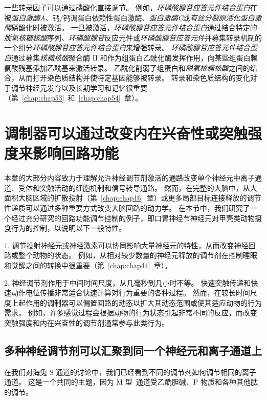 一些转录因子可以通过磷酸化直接调节。
例如，\textit{环磷酸腺苷应答元件结合蛋白}在被\textit{蛋白激酶A}、钙/钙调蛋白依赖性蛋白激酶、\textit{蛋白激酶C}或\textit{有丝分裂原活化蛋白激酶}磷酸化时被激活。
一旦被激活，\textit{环磷酸腺苷应答元件结合蛋白}通过结合特定的\textit{脱氧核糖核酸}序列、\textit{环磷酸腺苷}反应元件或\textit{环磷酸腺苷应答元件}并募集转录机制的一个组分\textit{环磷酸腺苷应答元件结合蛋白}来增强转录。
\textit{环磷酸腺苷应答元件结合蛋白}通过募集\textit{核糖核酸}聚合酶 II 和作为组蛋白乙酰化酶发挥作用，向某些组蛋白赖氨酸残基添加乙酰基来激活转录。
乙酰化削弱了组蛋白和\textit{脱氧核糖核酸}之间的结合，从而打开染色质结构并使特定基因能够被转录。
转录和染色质结构的变化对于调节神经元发育以及长期学习和记忆很重要（第~\ref{chap:chap53}~和~\ref{chap:chap54}~章）。



\section{调制器可以通过改变内在兴奋性或突触强度来影响回路功能}

本章的大部分内容致力于理解允许神经调节剂激活的通路改变单个神经元中离子通道、受体和突触活动的细胞机制和信号转导通路。
然而，在完整的大脑中，从大面积大脑区域的扩散投射（第~\ref{chap:chap16}~章）或更多局部目标连接释放的调节性递质可以通过多种重要方式改变大脑回路的动力学。
在本节中，我们研究了一个经过充分研究的回路功能调节控制的例子，即口胃神经节神经元对甲壳类动物摄食行为的控制，以说明以下一般特性。


1. 调节投射神经元或神经激素可以协同影响大量神经元的特性，从而改变神经回路或整个动物的状态。
例如，从相对较少数量的神经元释放的调节剂在控制睡眠和觉醒之间的转换中很重要（第~\ref{chap:chap44}~章）。


2. 神经调节剂作用于中间时间尺度，从几毫秒到几小时不等。
快速突触传递和快速动作电位传播非常适合快速计算对行为重要的各种过程。
然而，在较长时间尺度上起作用的调制器可以偏置回路的动态以扩大其动态范围或使其适应动物的行为需求。
例如，许多感觉过程会根据动物的行为状态引起非常不同的反应，而改变突触强度和内在兴奋性的调节剂通常参与此类行为。



\subsection{多种神经调节剂可以汇聚到同一个神经元和离子通道上}

在我们对海兔 S 通道的讨论中，我们已经看到不同的调节剂如何调节相同的离子通道。
这是一个共同的主题，因为 M 型~通道受乙酰胆碱、P 物质和各种其他肽的调节。


